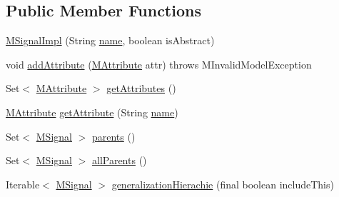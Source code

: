 \subsection*{Public Member Functions}
\begin{DoxyCompactItemize}
\item 
\hyperlink{classorg_1_1tzi_1_1use_1_1uml_1_1mm_1_1commonbehavior_1_1communications_1_1_m_signal_impl_a1bdbf21b5d31504b6bb4a281ba060af6}{M\-Signal\-Impl} (String \hyperlink{classorg_1_1tzi_1_1use_1_1uml_1_1mm_1_1_m_model_element_impl_ac9997b04c10d247c21c22d431d99400d}{name}, boolean is\-Abstract)
\item 
void \hyperlink{classorg_1_1tzi_1_1use_1_1uml_1_1mm_1_1commonbehavior_1_1communications_1_1_m_signal_impl_aee610943487cfb64f074e1834c6d50b0}{add\-Attribute} (\hyperlink{classorg_1_1tzi_1_1use_1_1uml_1_1mm_1_1_m_attribute}{M\-Attribute} attr)  throws M\-Invalid\-Model\-Exception 
\item 
Set$<$ \hyperlink{classorg_1_1tzi_1_1use_1_1uml_1_1mm_1_1_m_attribute}{M\-Attribute} $>$ \hyperlink{classorg_1_1tzi_1_1use_1_1uml_1_1mm_1_1commonbehavior_1_1communications_1_1_m_signal_impl_a5109300ebc09e027482fe871978fb8b7}{get\-Attributes} ()
\item 
\hyperlink{classorg_1_1tzi_1_1use_1_1uml_1_1mm_1_1_m_attribute}{M\-Attribute} \hyperlink{classorg_1_1tzi_1_1use_1_1uml_1_1mm_1_1commonbehavior_1_1communications_1_1_m_signal_impl_a76d485dcf70f125d8c6439063658c0c2}{get\-Attribute} (String \hyperlink{classorg_1_1tzi_1_1use_1_1uml_1_1mm_1_1_m_model_element_impl_ac9997b04c10d247c21c22d431d99400d}{name})
\item 
Set$<$ \hyperlink{interfaceorg_1_1tzi_1_1use_1_1uml_1_1mm_1_1commonbehavior_1_1communications_1_1_m_signal}{M\-Signal} $>$ \hyperlink{classorg_1_1tzi_1_1use_1_1uml_1_1mm_1_1commonbehavior_1_1communications_1_1_m_signal_impl_a934b7d7d4491b51d2e1ac48a4b4c19eb}{parents} ()
\item 
Set$<$ \hyperlink{interfaceorg_1_1tzi_1_1use_1_1uml_1_1mm_1_1commonbehavior_1_1communications_1_1_m_signal}{M\-Signal} $>$ \hyperlink{classorg_1_1tzi_1_1use_1_1uml_1_1mm_1_1commonbehavior_1_1communications_1_1_m_signal_impl_a8c264454b2ccf0f4c00ff15205a62202}{all\-Parents} ()
\item 
Iterable$<$ \hyperlink{interfaceorg_1_1tzi_1_1use_1_1uml_1_1mm_1_1commonbehavior_1_1communications_1_1_m_signal}{M\-Signal} $>$ \hyperlink{classorg_1_1tzi_1_1use_1_1uml_1_1mm_1_1commonbehavior_1_1communications_1_1_m_signal_impl_a2f40413c92bd3bb143f757a7591659fe}{generalization\-Hierachie} (final boolean include\-This)

\end{DoxyCompactItemize}
